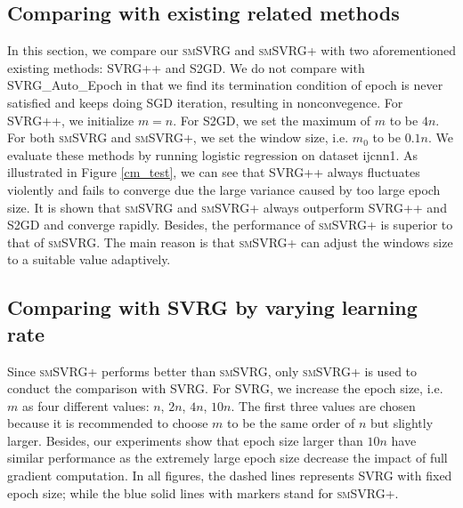 \documentclass[conference]{IEEEtran}
\begin{document}
\subsection{Comparing with existing related methods}
In this section, we compare our \textsc{smSVRG} and \textsc{smSVRG+} with two aforementioned existing methods: SVRG++ and S2GD. We do not compare with SVRG\_Auto\_Epoch in that we find its termination condition of epoch is never satisfied and keeps doing SGD iteration, resulting in nonconvegence. For SVRG++, we initialize $m = n$. For S2GD, we set the maximum of $m$ to be $4n$. For both \textsc{smSVRG} and \textsc{smSVRG+}, we set the window size, i.e. $m_0$ to be $0.1n$. We evaluate these methods by running logistic regression on dataset ijcnn1. 
As illustrated in Figure \ref{cm_test}, we can see that SVRG++ always fluctuates violently and fails to converge due the large variance caused by too large epoch size. It is shown that \textsc{smSVRG} and \textsc{smSVRG+} always outperform SVRG++ and S2GD and converge rapidly. Besides, the performance of \textsc{smSVRG+} is superior to that of \textsc{smSVRG}. The main reason is that \textsc{smSVRG+} can adjust the windows size to a suitable value adaptively.

 \subsection{Comparing with SVRG by varying learning rate}
Since \textsc{smSVRG+} performs better than \textsc{smSVRG}, only \textsc{smSVRG+} is used to conduct the comparison with SVRG. For SVRG, we increase the epoch size, i.e. $m$ as four different values: $n$, $2n$, $4n$, $10n$. The first three values are chosen because it is recommended to choose $m$ to be the same order of $n$ but slightly larger\citep{Johnson:9MAvkbgy}. Besides, our experiments show that epoch size larger than $10n$ have similar performance as the extremely large epoch size decrease the impact of full gradient computation. In all figures, the dashed lines represents SVRG with fixed epoch size; while the blue solid lines with markers stand for \textsc{smSVRG+}.
\end{document}

